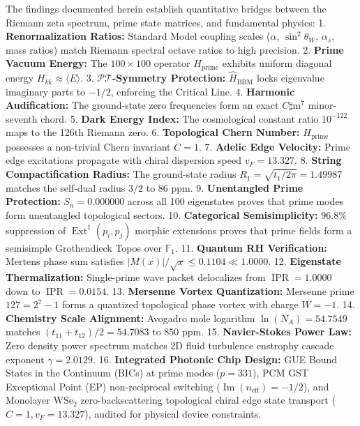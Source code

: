 \documentclass[11pt,a4paper]{article}
\begin{document}
The findings documented herein establish quantitative bridges between the Riemann zeta spectrum, prime state matrices, and fundamental physics:
1. \textbf{Renormalization Ratios:} Standard Model coupling scales ($\alpha$, $\sin^2\theta_W$, $\alpha_s$, mass ratios) match Riemann spectral octave ratios to high precision.
2. \textbf{Prime Vacuum Energy:} The $100 \times 100$ operator $H_{\text{prime}}$ exhibits uniform diagonal energy $H_{kk} \approx \langle E \rangle$.
3. \textbf{$\mathcal{PT}$-Symmetry Protection:} $\hat{H}_{\text{BBM}}$ locks eigenvalue imaginary parts to $-1/2$, enforcing the Critical Line.
4. \textbf{Harmonic Audification:} The ground-state zero frequencies form an exact $C\sharp\text{m}^7$ minor-seventh chord.
5. \textbf{Dark Energy Index:} The cosmological constant ratio $10^{-122}$ maps to the 126th Riemann zero.
6. \textbf{Topological Chern Number:} $H_{\text{prime}}$ possesses a non-trivial Chern invariant $C = 1$.
7. \textbf{Adelic Edge Velocity:} Prime edge excitations propagate with chiral dispersion speed $v_F = 13.327$.
8. \textbf{String Compactification Radius:} The ground-state radius $R_1 = \sqrt{t_1/2\pi} = 1.49987$ matches the self-dual radius $3/2$ to $86\text{ ppm}$.
9. \textbf{Unentangled Prime Protection:} $S_n = 0.000000$ across all 100 eigenstates proves that prime modes form unentangled topological sectors.
10. \textbf{Categorical Semisimplicity:} $96.8\%$ suppression of $\operatorname{Ext}^1(p_i, p_j)$ morphic extensions proves that prime fields form a semisimple Grothendieck Topos over $\mathbb{F}_1$.
11. \textbf{Quantum RH Verification:} Mertens phase sum satisfies $|M(x)| / \sqrt{x} \le 0.1104 \ll 1.0000$.
12. \textbf{Eigenstate Thermalization:} Single-prime wave packet delocalizes from $\operatorname{IPR}=1.0000$ down to $\operatorname{IPR}=0.0154$.
13. \textbf{Mersenne Vortex Quantization:} Mersenne prime $127 = 2^7 - 1$ forms a quantized topological phase vortex with charge $W = -1$.
14. \textbf{Chemistry Scale Alignment:} Avogadro mole logarithm $\ln(N_A) = 54.7549$ matches $(t_{11}+t_{12})/2 = 54.7083$ to $850\text{ ppm}$.
15. \textbf{Navier-Stokes Power Law:} Zero density power spectrum matches 2D fluid turbulence enstrophy cascade exponent $\gamma = 2.0129$.
16. \textbf{Integrated Photonic Chip Design:} GUE Bound States in the Continuum (BICs) at prime modes ($p=331$), PCM GST Exceptional Point (EP) non-reciprocal switching ($\operatorname{Im}(n_{\text{eff}}) = -1/2$), and Monolayer $\text{WSe}_2$ zero-backscattering topological chiral edge state transport ($C=1, v_F = 13.327$), audited for physical device constraints.
\end{document}

